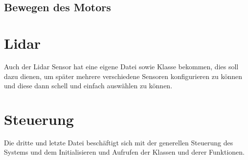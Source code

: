 \subsection{Bewegen des Motors}



\section{Lidar}
Auch der Lidar Sensor hat eine eigene Datei sowie Klasse bekommen, dies soll dazu dienen, um später mehrere verschiedene Sensoren konfigurieren zu können und diese dann schell und einfach auswählen zu können.

\section{Steuerung}
Die dritte und letzte Datei beschäftigt sich mit der generellen Steuerung des Systems und dem Initialisieren und Aufrufen der Klassen und derer Funktionen.